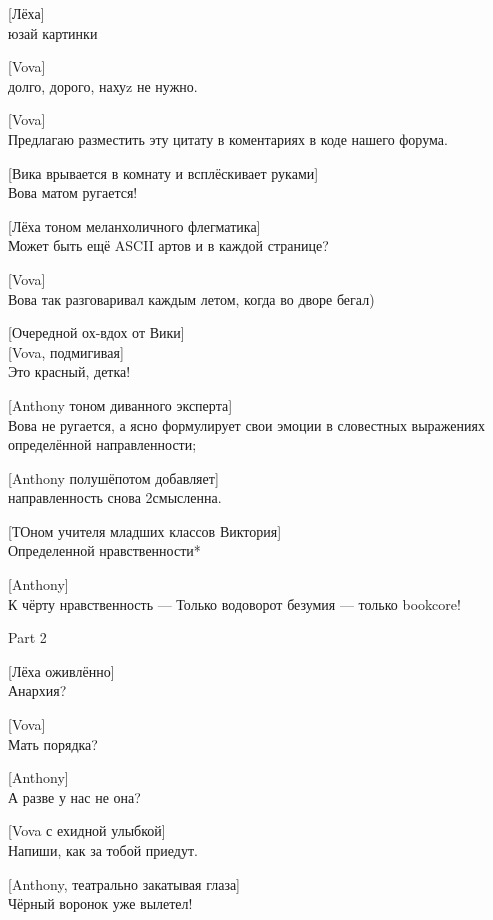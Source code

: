 [Лёха]\\
юзай картинки


[Vova]\\
долго, дорого, нахуz не нужно.


[Vova]\\
Предлагаю разместить эту цитату в коментариях в коде нашего форума.


[Вика врывается в комнату и всплёскивает руками]\\
Вова матом ругается!


[Лёха тоном меланхоличного флегматика]\\
Может быть ещё ASCII артов и в каждой странице?


[Vova]\\
Вова так разговаривал каждым летом, когда во дворе бегал)


[Очередной ох-вдох от Вики]\\


[Vova, подмигивая]\\
Это красный, детка!


[Anthony тоном диванного эксперта]\\
Вова не ругается, а ясно формулирует свои эмоции в словестных выражениях определённой направленности;


[Anthony полушёпотом добавляет]\\
направленность снова 2смысленна.


[ТОном учителя младших классов Виктория]\\
Определенной нравственности*


[Anthony]\\
К чёрту нравственность --- Только водоворот безумия --- только bookcore!


\begin{center}
\large Part 2
\end{center}


{\small{}}


[Лёха оживлённо]\\
Анархия?


[Vova]\\
Мать порядка?


[Anthony]\\
А разве у нас не она?


[Vova с ехидной улыбкой]\\
Напиши, как за тобой приедут.


[Anthony, театрально закатывая глаза]\\
Чёрный воронок уже вылетел!


